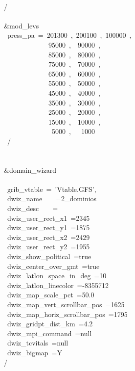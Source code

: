 \\
/\\
\\
\&mod\_levs\\
~press\_pa~=~201300~,~200100~,~100000~,\\
~~~~~~~~~~~~~95000~,~~90000~,\\
~~~~~~~~~~~~~85000~,~~80000~,\\
~~~~~~~~~~~~~75000~,~~70000~,\\
~~~~~~~~~~~~~65000~,~~60000~,\\
~~~~~~~~~~~~~55000~,~~50000~,\\
~~~~~~~~~~~~~45000~,~~40000~,\\
~~~~~~~~~~~~~35000~,~~30000~,\\
~~~~~~~~~~~~~25000~,~~20000~,\\
~~~~~~~~~~~~~15000~,~~10000~,\\
~~~~~~~~~~~~~~5000~,~~~1000\\
~/\\
\\
\\
\&domain\_wizard\\
\\
~grib\_vtable~=~'Vtable.GFS',\\
~dwiz\_name~~~~=2\_dominios\\
~dwiz\_desc~~~~=\\
~dwiz\_user\_rect\_x1~=2345\\
~dwiz\_user\_rect\_y1~=1875\\
~dwiz\_user\_rect\_x2~=2429\\
~dwiz\_user\_rect\_y2~=1955\\
~dwiz\_show\_political~=true\\
~dwiz\_center\_over\_gmt~=true\\
~dwiz\_latlon\_space\_in\_deg~=10\\
~dwiz\_latlon\_linecolor~=-8355712\\
~dwiz\_map\_scale\_pct~=50.0\\
~dwiz\_map\_vert\_scrollbar\_pos~=1625\\
~dwiz\_map\_horiz\_scrollbar\_pos~=1795\\
~dwiz\_gridpt\_dist\_km~=4.2\\
~dwiz\_mpi\_command~=null\\
~dwiz\_tcvitals~=null\\
~dwiz\_bigmap~=Y\\
/\\



